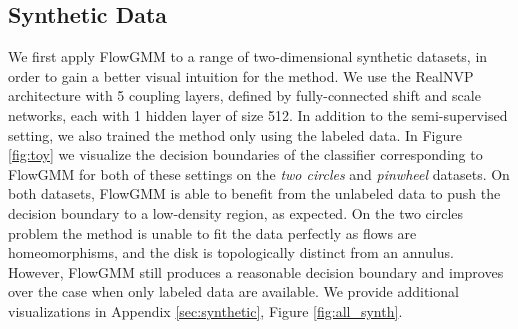 \documentclass{article}
\newcommand{\method}{FlowGMM\xspace}
\begin{document}
\subsection{Synthetic Data}
\label{sec:exp_toy}

We first apply \method to a range of two-dimensional synthetic datasets, 
in order to gain a better visual intuition for the method.
We use the RealNVP architecture with 5 coupling layers, defined 
by fully-connected shift and scale networks, each with 1 hidden 
layer of size 512.
In addition to the semi-supervised setting, we also trained the method only using the labeled data.
In Figure \ref{fig:toy} we visualize the decision boundaries of the classifier corresponding to \method for both of these settings on the \textit{two circles} and \textit{pinwheel} datasets. 
On both datasets, \method is able to benefit from the unlabeled data to push the decision boundary to a low-density region, as expected.
On the two circles problem the method is unable to fit the data perfectly as flows are homeomorphisms, and the disk is topologically distinct from an annulus.
However, \method still produces a reasonable decision boundary and improves over the case when only labeled data are available.
We provide additional visualizations in Appendix \ref{sec:synthetic},
Figure \ref{fig:all_synth}. 
\end{document}
